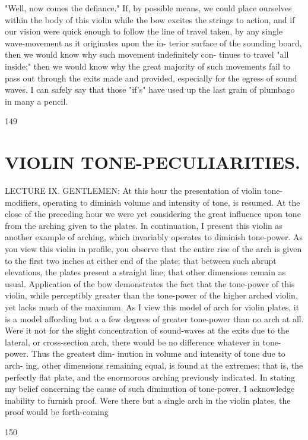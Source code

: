 \documentclass{article}
\begin{document}
"Well, now comes the defiance." If, by possible means, we could place ourselves within the body of this violin while the bow excites the strings to action, and if our vision were quick enough to follow the line of travel taken, by any single wave-movement as it originates upon the in- terior surface of the sounding board, then we would know why such movement indefinitely con- tinues to travel "all inside;" then we would know why the great majority of such movements fail to pass out through the exits made and provided, especially for the egress of sound waves. I can safely say that those "if's" have used up the last grain of plumbago in many a pencil.

149

\section*{VIOLIN TONE-PECULIARITIES.}
LECTURE IX. GENTLEMEN: At this hour the presentation of violin tone-modifiers, operating to diminish volume and intensity of tone, is resumed. At the close of the preceding hour we were yet considering the great influence upon tone from the arching given to the plates. In continuation, I present this violin as another example of arching, which invariably operates to diminish tone-power. As you view this violin in profile, you observe that the entire rise of the arch is given to the first two inches at either end of the plate; that between such abrupt elevations, the plates present a straight line; that other dimensions remain as usual. Application of the bow demonstrates the fact that the tone-power of this violin, while perceptibly greater than the tone-power of the higher arched violin, yet lacks much of the maximum. As I view this model of arch for violin plates, it is a model affording but a a few degrees of greater tone-power than no arch at all. Were it not for the slight concentration of sound-waves at the exits due to the lateral, or cross-section arch, there would be no difference whatever in tone-power. Thus the greatest dim- inution in volume and intensity of tone due to arch- ing, other dimensions remaining equal, is found at the extremes; that is, the perfectly flat plate, and the enormorous arching previously indicated. In stating my belief concerning the cause of such diminution of tone-power, I acknowledge inability to furnish proof. Were there but a single arch in the violin plates, the proof would be forth-coming

150
\end{document}
